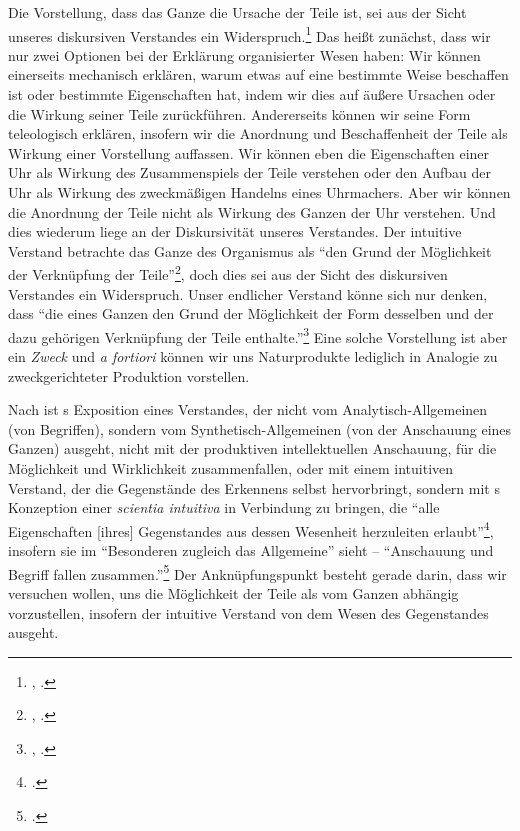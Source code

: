 Die Vorstellung, dass das Ganze die Ursache der Teile ist, sei aus der Sicht
unseres diskursiven Verstandes ein
Widerspruch.\footnote{\cite[Vgl.][\S~77]{Kant:KritikderUrteilskraft2009},
\cite[][V: 407.34--37]{Kant:GesammelteWerke1900ff.}.} Das heißt zunächst, dass
wir nur zwei Optionen bei der Erklärung organisierter Wesen haben: Wir können
einerseits mechanisch erklären, warum etwas auf eine bestimmte Weise beschaffen
ist oder bestimmte Eigenschaften hat, indem wir dies auf äußere Ursachen oder
die Wirkung seiner Teile zurückführen. Andererseits können wir seine Form
teleologisch erklären, insofern wir die Anordnung und Beschaffenheit der Teile
als Wirkung einer Vorstellung auffassen. Wir können eben die Eigenschaften einer
Uhr als Wirkung des Zusammenspiels der Teile verstehen oder den Aufbau der Uhr
als Wirkung des zweckmäßigen Handelns eines Uhrmachers. Aber wir können die
Anordnung der Teile nicht als Wirkung des Ganzen der Uhr verstehen. Und dies
wiederum liege an der Diskursivität unseres Verstandes. Der intuitive
Verstand betrachte das Ganze des Organismus als \enquote{den Grund der
Möglichkeit der Verknüpfung der
Teile}\footnote{\cite[][\S~77]{Kant:KritikderUrteilskraft2009},
\cite[][V: 407.36]{Kant:GesammelteWerke1900ff.}.}, doch dies sei aus der Sicht
des diskursiven Verstandes ein Widerspruch. Unser endlicher Verstand könne sich nur
denken, dass \enquote{die  eines Ganzen den Grund der Möglichkeit der Form
desselben und der dazu gehörigen Verknüpfung der Teile
enthalte.}\footnote{\cite[][\S~77]{Kant:KritikderUrteilskraft2009},
\cite[][V: 407.37--408.2]{Kant:GesammelteWerke1900ff.}.} Eine solche Vorstellung
ist aber ein \emph{Zweck} und \emph{a fortiori} können wir uns Naturprodukte lediglich in
Analogie zu zweckgerichteter Produktion vorstellen.

Nach  ist
s Exposition eines Verstandes, der nicht vom
Ana\-ly\-tisch-All\-ge\-mei\-nen (von Begriffen), sondern vom
Synthetisch-Allgemeinen (von der Anschauung eines Ganzen) ausgeht, nicht mit der
produktiven intellektuellen Anschauung, für die Möglichkeit und Wirklichkeit
zusammenfallen, oder mit einem intuitiven Verstand, der die Gegenstände des
Erkennens selbst hervorbringt, sondern mit
s Konzeption
einer \emph{scientia intuitiva} in Verbindung zu bringen, die \enquote{alle
Eigenschaften [ihres] Gegenstandes aus dessen Wesenheit herzuleiten
erlaubt}\footcite[][187]{Foerster:DieBedeutungvonSS7677deremphKritikderUrteilskraftfuerdieEntwicklungdernachkantischenPhilosophieTeil12002},
insofern sie im \enquote{Besonderen zugleich das Allgemeine} sieht --
\enquote{Anschauung und Begriff fallen
zusammen.}\footcite[][188]{Foerster:DieBedeutungvonSS7677deremphKritikderUrteilskraftfuerdieEntwicklungdernachkantischenPhilosophieTeil12002}
Der Anknüpfungspunkt besteht gerade darin, dass wir versuchen wollen, uns die
Möglichkeit der Teile als vom Ganzen abhängig vorzustellen, insofern der
intuitive Verstand von dem Wesen des Gegenstandes ausgeht.

